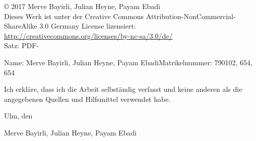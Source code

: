 \documentclass[
    a4paper,
    10pt,
    bibliography=totoc,
    twoside,
    openright,
    numbers=noenddot,
    headings=normal,
    DIV=9,
    parskip
]{scrbook}
\newcommand{\fullname}{Merve Bayirli, Julian Heyne, Payam Ebadi}
\newcommand{\jahr}{2017}
\newcommand{\matnr}{790102, 654, 654}
\newcommand{\FIXME}[1]{\colorbox{yellow}{\bf FIXME: #1}}
\begin{document}
{    %
    \copyright{} \jahr{} \fullname{}\\[0.5em]
    Dieses Werk ist unter der Creative Commons Attribution-NonCommercial-ShareAlike 3.0 Germany License lizensiert: \url{http://creativecommons.org/licenses/by-nc-sa/3.0/de/}\\
    Satz: PDF-\LaTeXe{}\\
}


\tableofcontents


\mainmatter







\appendix



\backmatter





\cleardoublepage
\thispagestyle{empty}

Name: \fullname \hfill Matrikelnummer: \matnr \vspace{2cm}


Ich erkläre, dass ich die Arbeit selbständig verfasst und keine anderen als die angegebenen Quellen und Hilfsmittel verwendet habe.\vspace{2cm}

Ulm, den \dotfill

\hfill {\footnotesize \fullname}
\end{document}
